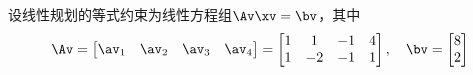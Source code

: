 \documentclass{ctexart}
\begin{document}
\begin{example}
    设线性规划的等式约束为线性方程组$\Av \xv = \bv$，其中
    \begin{align*}
        \Av = \begin{bmatrix}
                  \av_1 & \av_2 & \av_3 & \av_4
              \end{bmatrix} =
        \begin{bmatrix}
            1 & 1 & -1 & 4 \\ 1 & -2 & -1 & 1
        \end{bmatrix}, \quad \bv =
        \begin{bmatrix}
            8 \\ 2
        \end{bmatrix}
    \end{align*}


\end{example}
\end{document}

